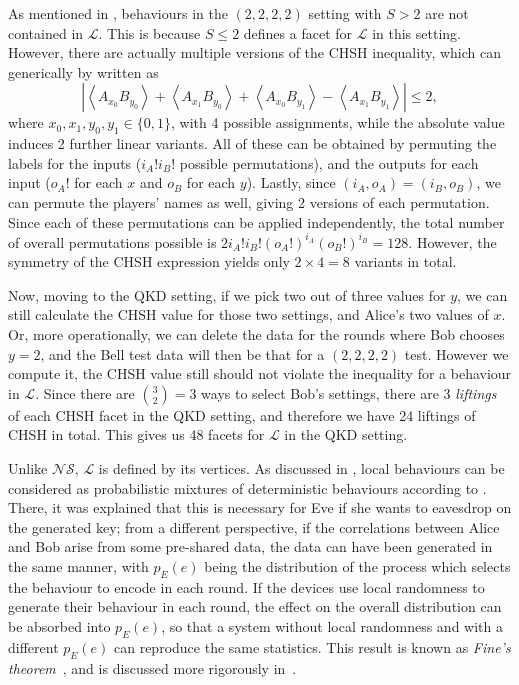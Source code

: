 \documentclass[10pt, a4paper]{article}
\numberwithin{equation}{section} %
\theoremstyle{definition}
\theoremstyle{plain}
\newcommand{\abs}[1]{\left\lvert#1\right\rvert}
\newcommand{\?}{\mathrel{?}} %
\newcommand{\angleb}[1]{\left\langle #1 \right\rangle} %
\newcommand{\Ls}{\mathcal{L}}
\newcommand{\NSs}{\mathcal{NS}}
\begin{document}
      As mentioned in , behaviours in the \((2,2,2,2)\) setting with \(S > 2\) are not contained in \(\Ls\). This is because \(S \leq 2\) defines a facet for \(\Ls\) in this setting. However, there are actually multiple versions of the CHSH inequality, which can generically by written as
      \[ \abs{\angleb{A_{x_0} B_{y_0}} + \angleb{A_{x_1} B_{y_0}} + \angleb{A_{x_0} B_{y_1}} - \angleb{A_{x_1} B_{y_1}}} \leq 2, \]
      where \(x_0, x_1, y_0, y_1 \in \{0,1\}\), with 4 possible assignments, while the absolute value induces 2 further linear variants. All of these can be obtained by permuting the labels for the inputs (\(i_A!i_B!\) possible permutations), and the outputs for each input (\(o_A!\) for each \(x\) and \(o_B\) for each \(y\)). Lastly, since \((i_A, o_A) = (i_B, o_B)\), we can permute the players' names as well, giving 2 versions of each permutation. Since each of these permutations can be applied independently, the total number of overall permutations possible is \(2i_A!i_B!(o_A!)^{i_A}(o_B!)^{i_B} = 128\). However, the symmetry of the CHSH expression yields only \(2 \times 4 = 8\) variants in total.

      Now, moving to the QKD setting, if we pick two out of three values for \(y\), we can still calculate the CHSH value for those two settings, and Alice's two values of \(x\). Or, more operationally, we can delete the data for the rounds where Bob chooses \(y=2\), and the Bell test data will then be that for a \((2,2,2,2)\) test. However we compute it, the CHSH value still should not violate the inequality for a behaviour in \(\Ls\). Since there are \(\binom{3}{2} = 3\) ways to select Bob's settings, there are 3 \emph{liftings} of each CHSH facet in the QKD setting, and therefore we have 24 liftings of CHSH in total. This gives us 48 facets for \(\Ls\) in the QKD setting.

      Unlike \(\NSs\), \(\Ls\) is defined by its vertices. As discussed in , local behaviours can be considered as probabilistic mixtures of deterministic behaviours according to . There, it was explained that this is necessary for Eve if she wants to eavesdrop on the generated key; from a different perspective, if the correlations between Alice and Bob arise from some pre-shared data, the data can have been generated in the same manner, with \(p_E(e)\) being the distribution of the process which selects the behaviour to encode in each round. If the devices use local randomness to generate their behaviour in each round, the effect on the overall distribution can be absorbed into \(p_E(e)\), so that a system without local randomness and with a different \(p_E(e)\) can reproduce the same statistics. This result is known as \emph{Fine's theorem}~\cite{FineThm}, and is discussed more rigorously in~\cite{BellNonlocality}.
\end{document}
